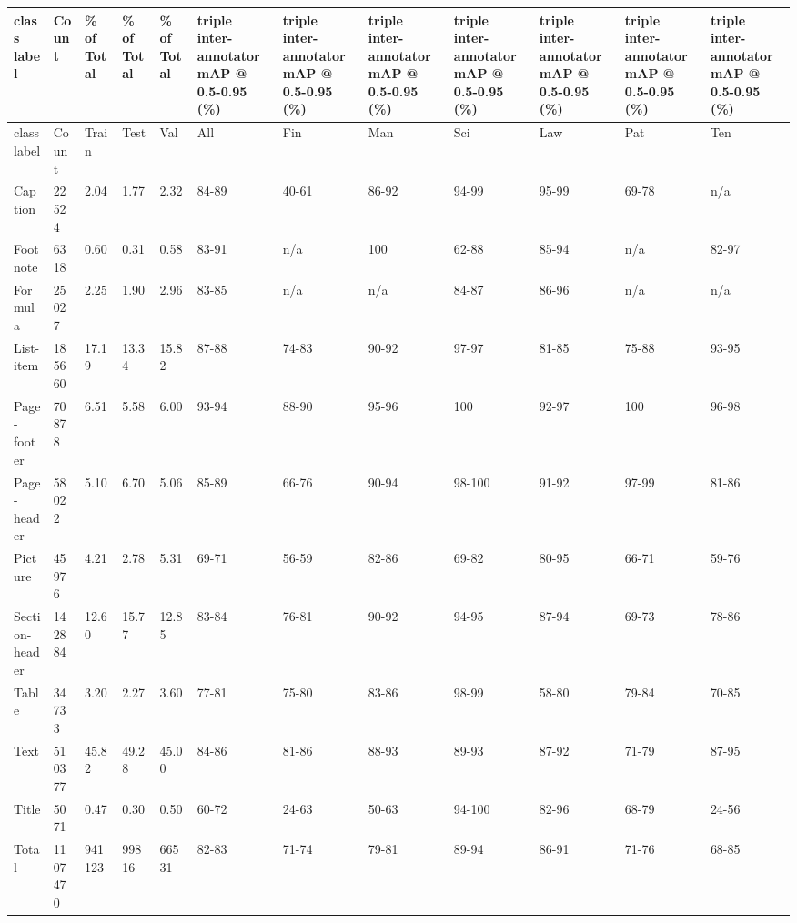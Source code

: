 \begin{table}[h]
\begin{tabular}{|l|l|l|l|l|l|l|l|l|l|l|l|}
\hline
class label & Count & \% of Total & \% of Total & \% of Total & triple inter-annotator mAP @ 0.5-0.95 (\%) & triple inter-annotator mAP @ 0.5-0.95 (\%) & triple inter-annotator mAP @ 0.5-0.95 (\%) & triple inter-annotator mAP @ 0.5-0.95 (\%) & triple inter-annotator mAP @ 0.5-0.95 (\%) & triple inter-annotator mAP @ 0.5-0.95 (\%) & triple inter-annotator mAP @ 0.5-0.95 (\%) \\ \hline
class label & Count & Train & Test & Val & All & Fin & Man & Sci & Law & Pat & Ten \\ \hline
Caption & 22524 & 2.04 & 1.77 & 2.32 & 84-89 & 40-61 & 86-92 & 94-99 & 95-99 & 69-78 & n/a \\ \hline
Footnote & 6318 & 0.60 & 0.31 & 0.58 & 83-91 & n/a & 100 & 62-88 & 85-94 & n/a & 82-97 \\ \hline
Formula & 25027 & 2.25 & 1.90 & 2.96 & 83-85 & n/a & n/a & 84-87 & 86-96 & n/a & n/a \\ \hline
List-item & 185660 & 17.19 & 13.34 & 15.82 & 87-88 & 74-83 & 90-92 & 97-97 & 81-85 & 75-88 & 93-95 \\ \hline
Page-footer & 70878 & 6.51 & 5.58 & 6.00 & 93-94 & 88-90 & 95-96 & 100 & 92-97 & 100 & 96-98 \\ \hline
Page-header & 58022 & 5.10 & 6.70 & 5.06 & 85-89 & 66-76 & 90-94 & 98-100 & 91-92 & 97-99 & 81-86 \\ \hline
Picture & 45976 & 4.21 & 2.78 & 5.31 & 69-71 & 56-59 & 82-86 & 69-82 & 80-95 & 66-71 & 59-76 \\ \hline
Section-header & 142884 & 12.60 & 15.77 & 12.85 & 83-84 & 76-81 & 90-92 & 94-95 & 87-94 & 69-73 & 78-86 \\ \hline
Table & 34733 & 3.20 & 2.27 & 3.60 & 77-81 & 75-80 & 83-86 & 98-99 & 58-80 & 79-84 & 70-85 \\ \hline
Text & 510377 & 45.82 & 49.28 & 45.00 & 84-86 & 81-86 & 88-93 & 89-93 & 87-92 & 71-79 & 87-95 \\ \hline
Title & 5071 & 0.47 & 0.30 & 0.50 & 60-72 & 24-63 & 50-63 & 94-100 & 82-96 & 68-79 & 24-56 \\ \hline
Total & 1107470 & 941123 & 99816 & 66531 & 82-83 & 71-74 & 79-81 & 89-94 & 86-91 & 71-76 & 68-85 \\ \hline
\end{tabular}
\end{table}

\begin{figure}[h]
\end{figure}

